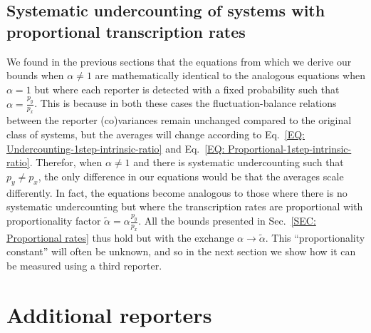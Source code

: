 \documentclass[%
 reprint,prx,
superscriptaddress,
%
%
%
%
%
%
%
%
%
 amsmath,amssymb,
 aps,
%
%
%
%
%
%
]{revtex4-2}
\begin{document}
{{\subsection{Systematic undercounting of systems with proportional transcription rates}
\label{SEC: Proportional both}
We found in the previous sections that the equations from which we derive our bounds when $\alpha \neq 1$ are mathematically identical to the analogous equations when $\alpha = 1$ but where each reporter is detected with a fixed probability such that $\alpha = \frac{p_{y}}{p_{x}}$. This is because in both these cases the fluctuation-balance relations between the reporter (co)variances remain unchanged compared to the original class of systems, but the averages will change according to Eq.~\eqref{EQ: Undercounting-1step-intrinsic-ratio} and Eq.~\eqref{EQ: Proportional-1step-intrinsic-ratio}. Therefor, when $\alpha \neq 1$ and there is systematic undercounting such that $p_{y} \neq p_{x}$, the only difference in our equations would be that the averages scale differently. In fact, the equations become analogous to those where there is no systematic undercounting but where the transcription rates are proportional with proportionality factor $\tilde{\alpha} = \alpha \frac{p_{y}}{p_{x}}$. All the bounds presented in Sec.~\ref{SEC: Proportional rates} thus hold but with the exchange $\alpha \to \tilde{\alpha}$. This ``proportionality constant'' will often be unknown, and so in the next section we show how it can be measured 
using a third reporter. 

\section{Additional reporters}
\label{SEC: Additional reporters}

}}
\end{document}
